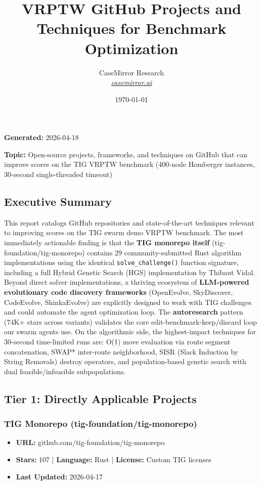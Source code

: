 \documentclass[twocolumn,10pt,letterpaper]{article}
\title{\vspace{-1.8em}\LARGE\bfseries\color{titlebg} VRPTW GitHub Projects and Techniques for Benchmark Optimization\vspace{-0.3em}}
\author{CaseMirror Research \\ \small\itshape\href{https://casemirror.ai}{\textcolor{headergray}{casemirror.ai}}}
\date{{\small\color{headergray} \today}}
\begin{document}
\maketitle
\thispagestyle{firstpage}
\vspace{-0.5em}


\textbf{Generated:} 2026-04-18

\textbf{Topic:} Open-source projects, frameworks, and techniques on GitHub that can improve scores on the TIG VRPTW benchmark (400-node Homberger instances, 30-second single-threaded timeout)


\subsection{Executive Summary}

This report catalogs GitHub repositories and state-of-the-art techniques relevant to improving scores on the TIG swarm demo VRPTW benchmark. The most immediately actionable finding is that the \textbf{TIG monorepo itself} (tig-foundation/tig-monorepo) contains 29 community-submitted Rust algorithm implementations using the identical \texttt{solve\_challenge()} function signature, including a full Hybrid Genetic Search (HGS) implementation by Thibaut Vidal. Beyond direct solver implementations, a thriving ecosystem of \textbf{LLM-powered evolutionary code discovery frameworks} (OpenEvolve, SkyDiscover, CodeEvolve, ShinkaEvolve) are explicitly designed to work with TIG challenges and could automate the agent optimization loop. The \textbf{autoresearch} pattern (74K+ stars across variants) validates the core edit-benchmark-keep/discard loop our swarm agents use. On the algorithmic side, the highest-impact techniques for 30-second time-limited runs are: O(1) move evaluation via route segment concatenation, SWAP* inter-route neighborhood, SISR (Slack Induction by String Removals) destroy operators, and population-based genetic search with dual feasible/infeasible subpopulations.


\subsection{Tier 1: Directly Applicable Projects}

\subsubsection{TIG Monorepo (tig-foundation/tig-monorepo)}

\begin{itemize}
\setlength{\itemsep}{0pt}
\setlength{\parskip}{0pt}
  \item \textbf{URL:} github.com/tig-foundation/tig-monorepo
  \item \textbf{Stars:} 107 | \textbf{Language:} Rust | \textbf{License:} Custom TIG licenses
  \item \textbf{Last Updated:} 2026-04-17
\end{itemize}
\end{document}
